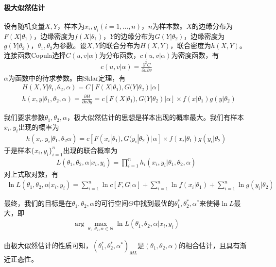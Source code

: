             \paragraph{极大似然估计}设有随机变量$X,Y$，样本为$x_i,y_i(i = 1,\dots,n)$，$n$为样本数。$X$的边缘分布为$F(X|\theta_1)$，边缘密度为$f(X|\theta_1)$，$Y$的边缘分布为$G(Y|\theta_2)$，边缘密度为$g(Y|\theta_2)$，$\theta_1,\theta_2$为参数。设$X,Y$的联合分布为$H(X,Y)$，联合密度为$h(X,Y)$。连接函数Copula选择$C(u,v|\alpha)$为分布函数，$c(u,v|\alpha)$为密度函数，有
            \begin{align*}
            c(u,v|\alpha) = \frac{\partial^2 C}{\partial u\partial  v}
            \end{align*}
            $\alpha$为函数中的待求参数。由Sklar定理，有
            \begin{align*}
            &H(X,Y|\theta_1,\theta_2,\alpha) = C[F(X|\theta_1),G(Y|\theta_2)|\alpha]\\
            &h(x,y|\theta_1,\theta_2,\alpha) = \frac{\partial H}{\partial x \partial y} = c[F(X|\theta_1),G(Y|\theta_2)|\alpha]\times f(x|\theta_1)g(y|\theta_2)
            \end{align*}
            \par
            我们要求参数$\theta_1,\theta_2,\alpha$，极大似然估计的思想是样本出现的概率最大。我们有样本$x_i,y_i$出现的概率为
            \begin{align*}
            h(x_i,y_i|\theta_1,\theta_2\alpha) = c[F(x_i|\theta_1),G(y_i|\theta_2)|\alpha]\times f(x_i|\theta_1)g(y_i|\theta_2)
            \end{align*}
            于是样本$\{x_i,y_i\}_{i = 1}^n$出现的联合概率为
            \begin{align*}
            L(\theta_1,\theta_2,\alpha|x_i,y_i) = \prod _{i=1}^nh_i(x_i,y_i|\theta_1,\theta_2,\alpha)
            \end{align*}
            对上式取对数，有
            \begin{align}
            \label{Copula参数估计的目标函数}
            \ln L(\theta_1,\theta_2,\alpha|x_i,y_i) = \sum_{i=1}^n\ln c[F,G|\alpha] + \sum_{i=1}^n \ln f(x_i|\theta_1)+ \sum_{i=1}^n \ln g(y_i|\theta_2)
            \end{align}
            \par
            最终，我们的目标是在$\theta_1,\theta_2,\alpha$的可行空间$\Theta$中找到最优的$\theta_1^*,\theta_2^*,\alpha^*$来使得$\ln L$最大，即
            \begin{align*}
            \arg \max\limits_{\theta_1,\theta_2,\alpha\in \Theta} \ln L(\theta_1,\theta_2,\alpha|x_i,y_i)
            \end{align*}
            \par
            由极大似然估计的性质可知，$(\theta_1^*,\theta_2^*,\alpha^*)_{ML}$是$(\theta_1,\theta_2,\alpha)$的相合估计，且具有渐近正态性。

